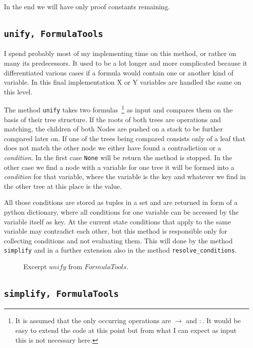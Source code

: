 In the end we will have only proof constants remaining.

\subsection[unify]{\texttt{unify, FormulaTools}}
I spend probably most of my implementing time on this method, or rather on many its predecessors. It used to be a lot longer and more complicated because it differentiated various cases if a formula would contain one or another kind of variable. In this final implementation X or Y variables are handled the same on this level.

The method \texttt{unify} takes two formulas~\footnote{It is assumed that the only occurring operations are $\rightarrow$ and $:$. It would be easy to extend the code at this point but from what I can expect as input this is not necessary here.} as input and compares them on the basis of their tree structure. If the roots of both trees are operations and matching, the children of both Nodes are pushed on a stack to be further compared later on. If one of the trees being compared consists only of a leaf that does not match the other node we either have found a contradiction or a \emph{condition}. In the first case \texttt{None} will be return the method is stopped. In the other case we find a node with a variable for one tree it will be formed into a \emph{condition} for that variable, where the variable is the key and whatever we find in the other tree at this place is the value.

All those conditions are stored as tuples in a set and are returned in form of a python dictionary, where all conditions for one variable can be accessed by the variable itself as key. At the current state conditions that apply to the same variable may contradict each other, but this method is responsible only for collecting conditions and not evaluating them. This will done by the method \texttt{simplify} and in a further extension also in the method \texttt{resolve\_conditions}.

\begin{figure}[H]
	\caption{Excerpt $unify$ from $FormulaTools$.}
	\vspace{-10pt}
	
	\vspace{-10pt}
\end{figure}


\subsection[simplify]{\texttt{simplify, FormulaTools}}

